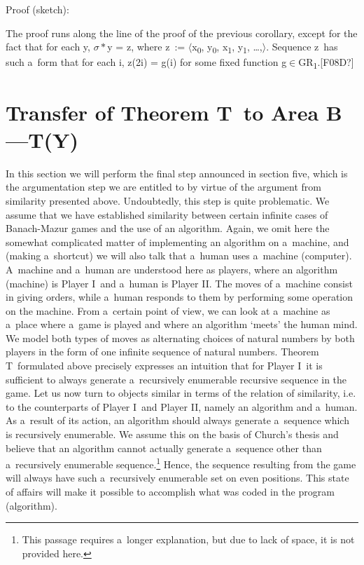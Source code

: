 {Proof (sketch):

The proof runs along the line of the proof of the previous corollary, except for the fact that for each y, ${\sigma}*$y = z, where z~:= ${\langle}$x\textsubscript{0}, y\textsubscript{0}, x\textsubscript{1}, y\textsubscript{1}, …,${\rangle}$. Sequence z~has such a~form that for each i, z(2i) = g(i) for some fixed function g${\in}$GR\textsubscript{1}.[F08D?]

\section{Transfer of Theorem T~to Area B—T(Y)}
In this section we will perform the final step announced in section five, which is the argumentation step we are entitled to by virtue of the argument from similarity presented above. Undoubtedly, this step is quite problematic. We assume that we have established similarity between certain infinite cases of Banach-Mazur games and the use of an algorithm. Again, we omit here the somewhat complicated matter of implementing an algorithm on a~machine, and (making a~shortcut) we will also talk that a~human uses a~machine (computer). A~machine and a~human are understood here as players, where an algorithm (machine) is Player I~and a~human is Player II. The moves of a~machine consist in giving orders, while a~human responds to them by performing some operation on the machine. From a~certain point of view, we can look at a~machine as a~place where a~game is played and where an algorithm ‘meets' the human mind. We model both types of moves as alternating choices of natural numbers by both players in the form of one infinite sequence of natural numbers. Theorem T~formulated above precisely expresses an intuition that for Player I~it is sufficient to always generate a~recursively enumerable recursive sequence in the game. Let us now turn to objects similar in terms of the relation of similarity, i.e. to the counterparts of Player I~and Player II, namely an algorithm and a~human. As a~result of its action, an algorithm should always generate a~sequence which is recursively enumerable. We assume this on the basis of Church's thesis and believe that an algorithm cannot actually generate a~sequence other than a~recursively enumerable sequence.\footnote{ This passage requires a~longer explanation, but due to lack of space, it is not provided here.} Hence, the sequence resulting from the game will always have such a~recursively enumerable set on even positions. This state of affairs will make it possible to accomplish what was coded in the program (algorithm).

}
